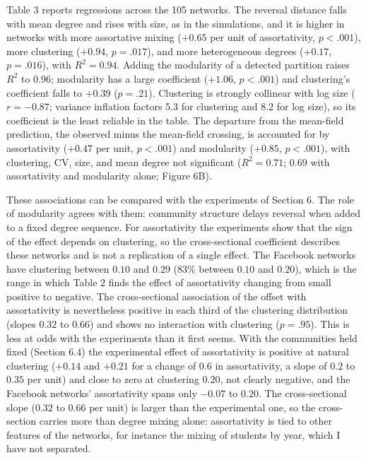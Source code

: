 \documentclass{nws}
\begin{document}
Table 3 reports regressions across the 105 networks. The reversal distance falls
with mean degree and rises with size, as in the simulations, and it is higher in
networks with more assortative mixing ($+0.65$ per unit of assortativity,
$p<.001$), more clustering ($+0.94$, $p=.017$), and more heterogeneous degrees
($+0.17$, $p=.016$), with $R^2=0.94$. Adding the modularity of a detected partition
raises $R^2$ to $0.96$; modularity has a large coefficient ($+1.06$, $p<.001$) and
clustering's coefficient falls to $+0.39$ ($p=.21$). Clustering is strongly
collinear with log size ($r=-0.87$; variance inflation factors 5.3 for clustering and
8.2 for log size), so its coefficient is the least reliable in the table. The
departure from the mean-field prediction, the observed minus the mean-field
crossing, is accounted for by assortativity ($+0.47$ per unit, $p<.001$) and
modularity ($+0.85$, $p<.001$), with clustering, CV, size, and mean degree not
significant ($R^2=0.71$; $0.69$ with assortativity and modularity alone;
Figure 6B).

These associations can be compared with the experiments of Section 6. The role of modularity agrees with them: community structure delays reversal when added to a fixed degree sequence. For assortativity the experiments show that the sign of the effect depends on clustering, so the cross-sectional coefficient describes these networks and is not a replication of a single effect. The Facebook networks have clustering between $0.10$ and $0.29$ (83\% between $0.10$ and $0.20$), which is the range in which Table 2 finds the effect of assortativity changing from small positive to negative. The cross-sectional association of the offset with assortativity is nevertheless positive in each third of the clustering distribution (slopes $0.32$ to $0.66$) and shows no interaction with clustering ($p=.95$). This is less at odds with the experiments than it first seems. With the communities held fixed (Section 6.4) the experimental effect of assortativity is positive at natural clustering ($+0.14$ and $+0.21$ for a change of $0.6$ in assortativity, a slope of $0.2$ to $0.35$ per unit) and close to zero at clustering $0.20$, not clearly negative, and the Facebook networks' assortativity spans only $-0.07$ to $0.20$. The cross-sectional slope ($0.32$ to $0.66$ per unit) is larger than the experimental one, so the cross-section carries more than degree mixing alone: assortativity is tied to other features of the networks, for instance the mixing of students by year, which I have not separated.
\end{document}
